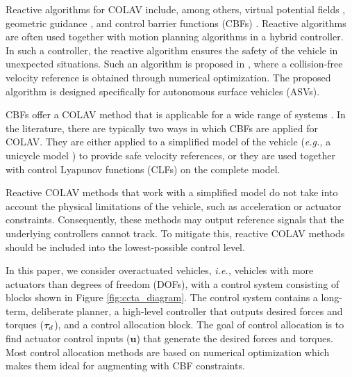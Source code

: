 Reactive algorithms for COLAV include, among others, virtual potential fields \cite{roussos_3d_2008}, geometric guidance \cite{mujumdar_reactive_2011}, and control barrier functions (CBFs) \cite{squires_constructive_2018,igarashi_collision_2018,romdlony_stabilization_2016,basso_safety-critical_2020,ames_control_2014}.
Reactive algorithms are often used together with motion planning algorithms in a hybrid controller.
In such a controller, the reactive algorithm ensures the safety of the vehicle in unexpected situations.
Such an algorithm is proposed in \cite{hedjar_automatic_2019}, where a collision-free velocity reference is obtained through numerical optimization.
The proposed algorithm is designed specifically for autonomous surface vehicles (ASVs).

CBFs offer a COLAV method that is applicable for a wide range of systems \cite{ames_control_2019}.
In the literature, there are typically two ways in which CBFs are applied for COLAV.
They are either applied to a simplified model of the vehicle (\emph{e.g.,} a unicycle model \cite{squires_constructive_2018,igarashi_collision_2018}) to provide safe velocity references, or they are used together with control Lyapunov functions (CLFs) \cite{romdlony_stabilization_2016,basso_safety-critical_2020,ames_control_2014} on the complete model.

Reactive COLAV methods that work with a simplified model do not take into account the physical limitations of the vehicle, such as acceleration or actuator constraints.
Consequently, these methods may output reference signals that the underlying controllers cannot track.
To mitigate this, reactive COLAV methods should be included into the lowest-possible control level.

In this paper, we consider overactuated vehicles, \emph{i.e.,} vehicles with more actuators than degrees of freedom (DOFs), with a control system consisting of blocks shown in Figure \ref{fig:ccta_diagram}.
The control system contains a long-term, deliberate planner, a high-level controller that outputs desired forces and torques ($\bm{\tau}_d$), and a control allocation block.
The goal of control allocation is to find actuator control inputs ($\mathbf{u}$) that generate the desired forces and torques.
Most control allocation methods are based on numerical optimization \cite{oppenheimer_control_2006,harkegard_dynamic_2004,johansen_constrained_2004} which makes them ideal for augmenting with CBF constraints.

